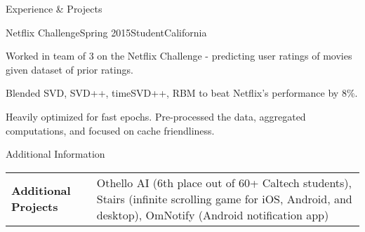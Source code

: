 \documentclass{resume} %
\begin{document}
\begin{rSection}{Experience \& Projects}

\begin{rSubsection}{Netflix Challenge}{Spring 2015}{Student}{California}
\item Worked in team of 3 on the Netflix Challenge - predicting user ratings of movies given dataset of prior ratings.
\item Blended SVD, SVD++, timeSVD++, RBM to beat Netflix's performance by  8\%.
\item Heavily optimized for fast epochs. Pre-processed the data, aggregated
    computations, and focused on cache friendliness.
\end{rSubsection}


\end{rSection}




\begin{rSection}{Additional Information}

\noindent\begin{tabularx}{.98\textwidth}{@{}lX}
    \bfseries{Additional Projects}   &  Othello AI (6th place out of 60+ Caltech
    students), Stairs (infinite scrolling game for iOS, Android, and desktop),
    OmNotify (Android notification app) \\
\end{tabularx}

\end{rSection}
\end{document}
